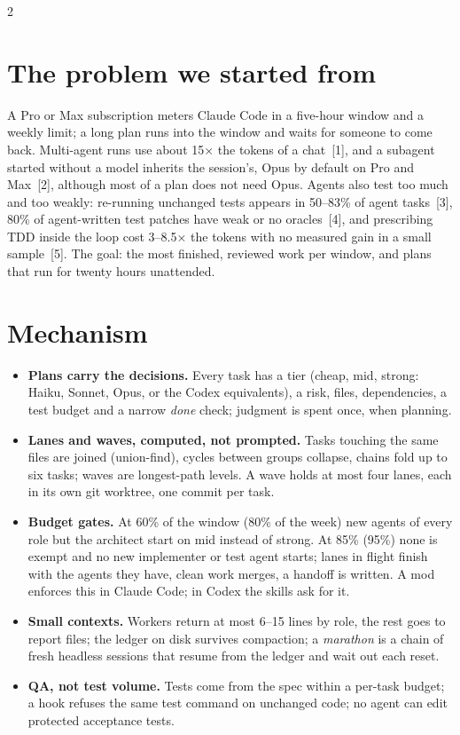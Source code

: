 \documentclass[9pt,a4paper]{extarticle}
\newcommand{\para}[1]{\textsf{\textbf{#1}}\enspace}
\begin{document}
\begin{multicols}{2}
\fontsize{8.7}{10.4}\selectfont

\section{The problem we started from}
A Pro or Max subscription meters Claude Code in a five-hour window and a weekly limit; a long plan runs into the window and waits for someone to come back. Multi-agent runs use about 15× the tokens of a chat~[1], and a subagent started without a model inherits the session's, Opus by default on Pro and Max~[2], although most of a plan does not need Opus. Agents also test too much and too weakly: re-running unchanged tests appears in 50--83\% of agent tasks~[3], 80\% of agent-written test patches have weak or no oracles~[4], and prescribing TDD inside the loop cost 3--8.5× the tokens with no measured gain in a small sample~[5]. The goal: the most finished, reviewed work per window, and plans that run for twenty hours unattended.

\section{Mechanism}
\begin{itemize}
\item \para{Plans carry the decisions.} Every task has a tier (cheap, mid, strong: Haiku, Sonnet, Opus, or the Codex equivalents), a risk, files, dependencies, a test budget and a narrow \emph{done} check; judgment is spent once, when planning.
\item \para{Lanes and waves, computed, not prompted.} Tasks touching the same files are joined (union-find), cycles between groups collapse, chains fold up to six tasks; waves are longest-path levels. A wave holds at most four lanes, each in its own git worktree, one commit per task.
\item \para{Budget gates.} At 60\% of the window (80\% of the week) new agents of every role but the architect start on mid instead of strong. At 85\% (95\%) none is exempt and no new implementer or test agent starts; lanes in flight finish with the agents they have, clean work merges, a handoff is written. A mod enforces this in Claude Code; in Codex the skills ask for it.
\item \para{Small contexts.} Workers return at most 6--15 lines by role, the rest goes to report files; the ledger on disk survives compaction; a \emph{marathon} is a chain of fresh headless sessions that resume from the ledger and wait out each reset.
\item \para{QA, not test volume.} Tests come from the spec within a per-task budget; a hook refuses the same test command on unchanged code; no agent can edit protected acceptance tests.
\end{itemize}


\end{multicols}
\end{document}
